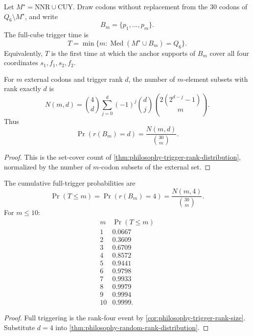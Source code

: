 \begin{definition}
\label{def:philosophy-random-trigger-time}
Let $M^{\star}=\mathrm{NNR}\cup\mathrm{CUY}$. Draw codons without
replacement from the $30$ codons of $Q_{6}\setminus M^{\star}$, and
write
$$
  B_{m}=\{p_{1},\ldots,p_{m}\}.
$$
The full-cube trigger time is
$$
  T=\min\{m:\operatorname{Med}(M^{\star}\cup B_{m})=Q_{6}\}.
$$
Equivalently, $T$ is the first time at which the anchor supports of
$B_{m}$ cover all four coordinates $s_{1},f_{1},s_{2},f_{2}$.
\end{definition}

\begin{theorem}
\label{thm:philosophy-random-rank-distribution}
For $m$ external codons and trigger rank $d$, the number of $m$-element
subsets with rank exactly $d$ is
$$
  N(m,d)
  =
  \binom{4}{d}
  \sum_{j=0}^{d}
  (-1)^{j}
  \binom{d}{j}
  \binom{2(2^{d-j}-1)}{m}.
$$
Thus
$$
  \Pr(r(B_{m})=d)=\frac{N(m,d)}{\binom{30}{m}}.
$$
\end{theorem}
\begin{proof}
This is the set-cover count of
\autoref{thm:philosophy-trigger-rank-distribution}, normalized by the
number of $m$-codon subsets of the external set.
\end{proof}

\begin{theorem}
\label{thm:philosophy-full-trigger-distribution}
The cumulative full-trigger probabilities are
$$
  \Pr(T\leq m)=\Pr(r(B_{m})=4)=\frac{N(m,4)}{\binom{30}{m}}.
$$
For $m\leq 10$:
$$
\begin{array}{c|r}
  m & \Pr(T\leq m)\\
  \hline
  1 & 0.0667\\
  2 & 0.3609\\
  3 & 0.6709\\
  4 & 0.8572\\
  5 & 0.9441\\
  6 & 0.9798\\
  7 & 0.9933\\
  8 & 0.9979\\
  9 & 0.9994\\
  10 & 0.9999.
\end{array}
$$
\end{theorem}
\begin{proof}
Full triggering is the rank-four event by
\autoref{cor:philosophy-trigger-rank-size}. Substitute $d=4$ into
\autoref{thm:philosophy-random-rank-distribution}.
\end{proof}

